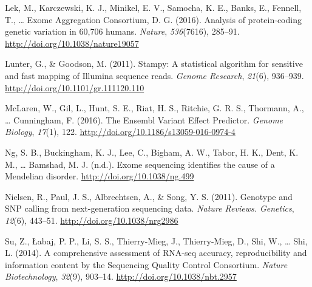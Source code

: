 \documentclass[12pt,twoside]{reedthesis}
\theoremstyle{definition}
\theoremstyle{definition}
\theoremstyle{remark}
\begin{document}
  \hypertarget{ref-Lek2016}{}
  Lek, M., Karczewski, K. J., Minikel, E. V., Samocha, K. E., Banks, E.,
  Fennell, T., \ldots{} Exome Aggregation Consortium, D. G. (2016).
  Analysis of protein-coding genetic variation in 60,706 humans.
  \emph{Nature}, \emph{536}(7616), 285--91.
  \url{http://doi.org/10.1038/nature19057}
  
  \hypertarget{ref-Lunter2011}{}
  Lunter, G., \& Goodson, M. (2011). Stampy: A statistical algorithm for
  sensitive and fast mapping of Illumina sequence reads. \emph{Genome
  Research}, \emph{21}(6), 936--939.
  \url{http://doi.org/10.1101/gr.111120.110}
  
  \hypertarget{ref-McLaren2016}{}
  McLaren, W., Gil, L., Hunt, S. E., Riat, H. S., Ritchie, G. R. S.,
  Thormann, A., \ldots{} Cunningham, F. (2016). The Ensembl Variant Effect
  Predictor. \emph{Genome Biology}, \emph{17}(1), 122.
  \url{http://doi.org/10.1186/s13059-016-0974-4}
  
  \hypertarget{ref-Ng}{}
  Ng, S. B., Buckingham, K. J., Lee, C., Bigham, A. W., Tabor, H. K.,
  Dent, K. M., \ldots{} Bamshad, M. J. (n.d.). Exome sequencing identifies
  the cause of a Mendelian disorder. \url{http://doi.org/10.1038/ng.499}
  
  \hypertarget{ref-Nielsen2011}{}
  Nielsen, R., Paul, J. S., Albrechtsen, A., \& Song, Y. S. (2011).
  Genotype and SNP calling from next-generation sequencing data.
  \emph{Nature Reviews. Genetics}, \emph{12}(6), 443--51.
  \url{http://doi.org/10.1038/nrg2986}
  
  \hypertarget{ref-Su2014}{}
  Su, Z., Łabaj, P. P., Li, S. S., Thierry-Mieg, J., Thierry-Mieg, D.,
  Shi, W., \ldots{} Shi, L. (2014). A comprehensive assessment of RNA-seq
  accuracy, reproducibility and information content by the Sequencing
  Quality Control Consortium. \emph{Nature Biotechnology}, \emph{32}(9),
  903--14. \url{http://doi.org/10.1038/nbt.2957}


\end{document}
